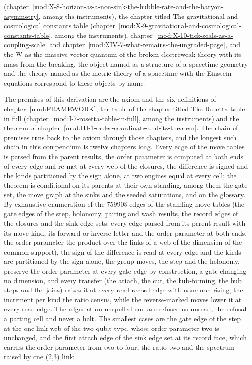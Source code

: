 \begin{chbridge}
(chapter~\ref{mod:X-8-horizon-as-a-non-sink-the-hubble-rate-and-the-baryon-asymmetry}, among the instruments), the chapter titled The gravitational and cosmological constants table (chapter~\ref{mod:X-9-gravitational-and-cosmological-constants-table}, among the instruments), chapter~\ref{mod:X-10-tick-scale-as-a-coupling-scale} and chapter~\ref{mod:XIV-7-what-remains-the-ungraded-page}, and the W as the massive vector quantum of the broken electroweak theory with its mass from the breaking, the object named as a structure of a spacetime geometry and the theory named as the metric theory of a spacetime with the Einstein equations correspond to these objects by name.
\end{chbridge}
\begin{chproof}[census]
The premises of this derivation are the axiom and the six definitions of chapter~\ref{mod:FRAMEWORK}, the table of the chapter titled The Rosetta table in full (chapter~\ref{mod:I-7-rosetta-table-in-full}, among the instruments) and the theorem of chapter~\ref{mod:III-1-order-coordinate-and-its-theorem}. The chain of premises runs back to the axiom through those chapters, and the longest such chain in this compendium is twelve chapters long.
Every edge of the move tables is parsed from the parent results, the order parameter is computed at both ends of every edge and re-met at every web of the closures, the difference is signed and the kinds partitioned by the sign alone, at two engines equal at every cell; the theorem is conditional on its parents at their own standing, among them the gate set, the move graph at the sinks and the seeded saturations, and on the glossary.
By exhaustive enumeration of the 759908 edges of the standing move tables (the gate edges of the step, holonomy, pairing and wash results, the record edges of the closures and the sink edge sets, every edge parsed from its parent result with its move kind, its forward or inverse letter and the order parameter at both ends, the order parameter the product over the links of a web of the dimension of the common support), the sign of the difference is read at every edge and the kinds are partitioned by the sign alone, the group moves, the step and the holonomy, preserve the order parameter at every gate edge by construction, a gate changing no dimension, and every transfer (the attach, the cut, the hub-forming, the hub steps and the joins) raises it at every read record edge with none non-rising, the increment per kind the ratio census, while the reverse-marked moves lower it at every read edge. The edges at an unspelled end are refused as unread, the refusal a parting cell and never a halt. The smallest cases are the gate edge of the step at the one-link web of the two-qubit type, whose order parameter two is unchanged, and the first attach edge of the sink edge set at its record face, which carries the order parameter from two to four, the ratio two and the spectrum raised by one (2,3) link:

\end{chproof}
